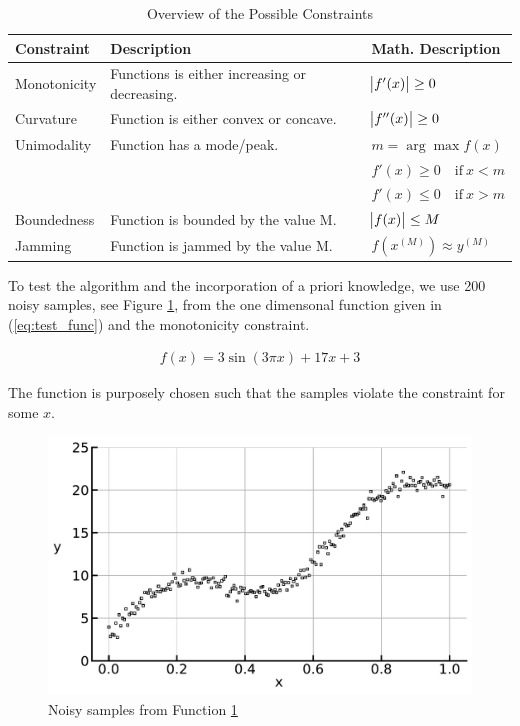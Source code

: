 \documentclass[10pt,a4paper]{article}
\begin{document}
	\begin{table}[h]
	\centering
	\begin{tabular}{|lll|}
		\hline
		\textbf{Constraint} & \textbf{Description}                         & \textbf{Math. Description} 	\\ \hline  \toprule
		Monotonicity        & Functions is either increasing or decreasing.& $\abs{f'(x)} \ge 0$ 			\\ \hline
		Curvature           & Function is either convex or concave.        & $\abs{f''(x)} \ge 0$ 			\\ \hline
		Unimodality        & Function has a mode/peak.                    & $m = \arg \max f(x)$ 				\\ 
							&	   										   & $f'(x) \ge 0 \quad \text{if} \ x < m$  \\ 
							&  											   & $f'(x) \le 0 \quad \text{if} \ x > m$  \\ \hline
		Boundedness         & Function is bounded by the value M.          & $\abs{f(x)} \le M$ 			\\ \hline
		Jamming             & Function is jammed by the value M.           & $f(x^{(M)}) \approx y^{(M)}$	\\ \hline \bottomrule
	\end{tabular}
	\caption{Overview of the Possible Constraints}
	\label{tab:constraint_overview}
	\end{table}
		
	To test the algorithm and the incorporation of a priori knowledge, we use 200 noisy samples, see Figure \ref{fig:test_func}, from the one dimensonal function given in (\ref{eq:test_func}) and the monotonicity constraint. 
	
	\begin{align}\label{eq:test_func}
	f(x) = 3\sin(3\pi x) + 17x + 3
	\end{align}
	
	The function is purposely chosen such that the samples violate the constraint for some $x$. 
	
	\begin{figure}[H]
		\centering
		\includegraphics[width=\columnwidth]{../thesisplots/test_func.pdf}
		\caption{Noisy samples from Function \ref{fig:test_func}}
		\label{fig:test_func}
	\end{figure}
\end{document}
